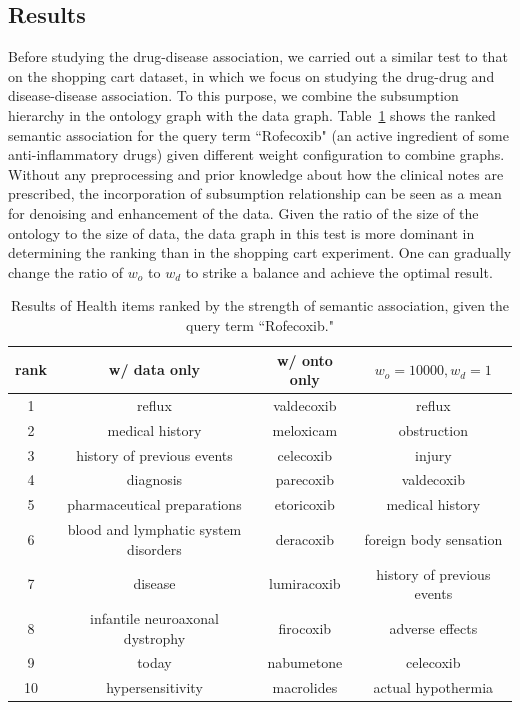 \subsection{Results}
Before studying the drug-disease association, we carried out a similar test to that on the shopping cart dataset, in which we focus on studying the drug-drug and disease-disease association. To this purpose, we combine the subsumption hierarchy in the ontology graph with the data graph. Table~\ref{tbl:health_comp} shows the ranked semantic association for the query term ``Rofecoxib" (an active ingredient of some anti-inflammatory drugs) given different weight configuration to combine graphs. Without any preprocessing and prior knowledge about how the clinical notes are prescribed, the incorporation of subsumption relationship can be seen as a mean for denoising and enhancement of the data. Given the ratio of the size of the ontology to the size of data, the data graph in this test is more dominant in determining the ranking than in the shopping cart experiment. One can gradually change the ratio of $w_o$ to $w_d$ to strike a balance and achieve the optimal result.
\begin{table}[tbh]\scriptsize
\begin{center}
\begin{tabular}{ c | c | c | c  }
\hline
rank    &   w/ data only	&	w/ onto only		&$w_o=10000, w_d=1$	 \\
\hline
1	&		reflux	&	valdecoxib	&		reflux	\\
2	&		medical history	&	meloxicam	&		obstruction	\\
3	&		history of previous events	&	celecoxib	&		injury	\\
4	&		diagnosis	&	parecoxib	&		valdecoxib	\\
5	&		pharmaceutical preparations	&	etoricoxib	&		medical history	\\
6	&		blood and lymphatic system disorders	&	deracoxib	&		foreign body sensation	\\
7	&		disease	&	lumiracoxib	&		history of previous events	\\
8	&		infantile neuroaxonal dystrophy	&	firocoxib	&		adverse effects	\\
9	&		today	&	nabumetone	&		celecoxib	\\
10	&		hypersensitivity	&	macrolides	&		actual hypothermia	\\
\hline
\end{tabular}
\end{center}
\caption[Top results on the electronic health dataset]{\label{tbl:health_comp}Results of Health items ranked by the strength of semantic association, given the query term ``Rofecoxib."}
\end{table}

